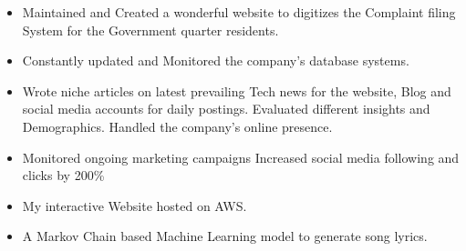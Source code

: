\documentclass[10pt,a4paper,ragged2e]{altacv}
\begin{document}
\begin{itemize}
\item Maintained and Created a wonderful website to digitizes the Complaint filing System for the Government quarter residents. 
\item Constantly updated and Monitored the company’s database systems.

\end{itemize}



\begin{itemize}
\item Wrote niche articles on latest prevailing Tech news for the website, Blog and social media accounts for daily postings.
Evaluated different insights and Demographics. Handled the company’s online presence.
 \item Monitored ongoing marketing campaigns
Increased social media following and clicks by 200\%

\end{itemize}


\begin{itemize}
\item My interactive Website hosted on AWS.
\end{itemize}

\begin{itemize}
\item A Markov Chain based Machine Learning model to generate song lyrics. 
\end{itemize}


\end{document}
